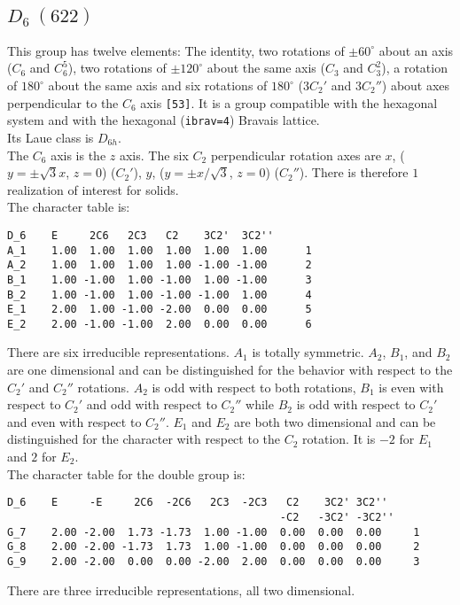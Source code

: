 \documentclass[12pt,a4paper]{article}
\begin{document}
\subsection{\color{web-blue}$D_6\ (622)$} 
This group has twelve elements: The identity, two rotations of 
$\pm60^\circ$ about an axis ($C_6$ and $C_6^5$), two rotations of 
$\pm120^\circ$ about the same axis
($C_3$ and $C_3^2$), a rotation of $180^\circ$ about the same axis and
six rotations of $180^\circ$ ($3C_2'$ and $3C_2''$) about axes perpendicular 
to the $C_6$ axis \texttt{[53]}. It is a group compatible with the 
hexagonal system and with the
hexagonal (\texttt{ibrav=4}) Bravais lattice. \\ 
Its Laue class is $D_{6h}$. \\
The $C_6$ axis is the $z$ axis. The six $C_2$ perpendicular rotation axes are
$x$, ($y=\pm\sqrt{3}x$, $z=0$) ($C_2'$), 
$y$, ($y=\pm x/\sqrt{3}$, $z=0$) ($C_2''$). There is therefore
$1$ realization of interest for solids. \\
The character table is:
\begin{verbatim}
D_6    E     2C6   2C3   C2    3C2'  3C2''
A_1    1.00  1.00  1.00  1.00  1.00  1.00      1
A_2    1.00  1.00  1.00  1.00 -1.00 -1.00      2
B_1    1.00 -1.00  1.00 -1.00  1.00 -1.00      3
B_2    1.00 -1.00  1.00 -1.00 -1.00  1.00      4
E_1    2.00  1.00 -1.00 -2.00  0.00  0.00      5
E_2    2.00 -1.00 -1.00  2.00  0.00  0.00      6
\end{verbatim}
There are six irreducible representations. $A_1$ is totally symmetric.
$A_2$, $B_1$, and $B_2$ are one dimensional and can be distinguished for the
behavior with respect to the $C_2'$ and $C_2''$ rotations. $A_2$ is odd 
with respect to both rotations, $B_1$ is even with respect to $C_2'$ and 
odd with respect to $C_2''$ while $B_2$ is odd with respect to $C_2'$ and
even with respect to $C_2''$. $E_1$ and $E_2$ are both two dimensional and
can be distinguished for the character with respect to the $C_2$ 
rotation. It is $-2$ for $E_1$ and $2$ for $E_2$. \\
The character table for the double group is:
\begin{verbatim}
D_6    E     -E     2C6  -2C6   2C3  -2C3   C2    3C2' 3C2''
                                           -C2   -3C2' -3C2''
G_7    2.00 -2.00  1.73 -1.73  1.00 -1.00  0.00  0.00  0.00     1
G_8    2.00 -2.00 -1.73  1.73  1.00 -1.00  0.00  0.00  0.00     2
G_9    2.00 -2.00  0.00  0.00 -2.00  2.00  0.00  0.00  0.00     3
\end{verbatim}
There are three irreducible representations, all two dimensional. 
\end{document}
